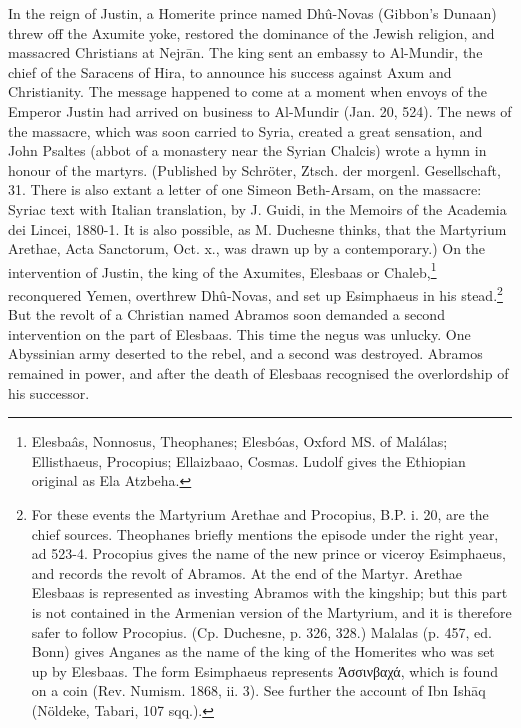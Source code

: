 In the reign of Justin, a Homerite prince named Dhû-Novas (Gibbon\texthebrew{}’s Dunaan) threw off the Axumite yoke, restored the dominance of the Jewish religion, and massacred Christians at Nejrān. The king sent an embassy to Al-Mundir, the chief of the Saracens of Hira, to announce his success against Axum and Christianity. The message happened to come at a moment when envoys of the Emperor Justin had arrived on business to Al-Mundir (Jan. 20, 524). The news of the massacre, which was soon carried to Syria, created a great sensation, and John Psaltes (abbot of a monastery near the Syrian Chalcis) wrote a hymn in honour of the martyrs. (Published by Schröter, Ztsch. der morgenl. Gesellschaft, 31. There is also extant a letter of one Simeon Beth-Arsam, on the massacre: Syriac text with Italian translation, by J. Guidi, in the Memoirs of the Academia dei Lincei, 1880-1. It is also possible, as M. Duchesne thinks, that the Martyrium Arethae, Acta Sanctorum, Oct. x., was drawn up by a contemporary.) On the intervention of Justin, the king of the Axumites, Elesbaas or Chaleb,\footnote{Elesbaâs, Nonnosus, Theophanes; Elesbóas, Oxford MS. of Malálas; Ellisthaeus, Procopius; Ellaizbaao, Cosmas. Ludolf gives the Ethiopian original as Ela Atzbeha.} reconquered Yemen, overthrew Dhû-Novas, and set up Esimphaeus in his stead.\footnote{For these events the Martyrium Arethae and Procopius, B.P. i. 20, are the chief sources. Theophanes briefly mentions the episode under the right year, ad 523-4. Procopius gives the name of the new prince or viceroy Esimphaeus, and records the revolt of Abramos. At the end of the Martyr. Arethae Elesbaas is represented as investing Abramos with the kingship; but this part is not contained in the Armenian version of the Martyrium, and it is therefore safer to follow Procopius. (Cp. Duchesne, p. 326, 328.) Malalas (p. 457, ed. Bonn) gives Anganes as the name of the king of the Homerites who was set up by Elesbaas. The form Esimphaeus represents \textgreek{\texthebrew{Ἁ}σσινβαχά}, which is found on a coin (Rev. Numism. 1868, ii. 3). See further the account of Ibn Ishāq (Nöldeke, Tabari, 107 sqq.).} But the revolt of a Christian named Abramos soon demanded a second intervention on the part of Elesbaas. This time the negus was unlucky. One Abyssinian army deserted to the rebel, and a second was destroyed. Abramos remained in power, and after the death of Elesbaas recognised the overlordship of his successor.

